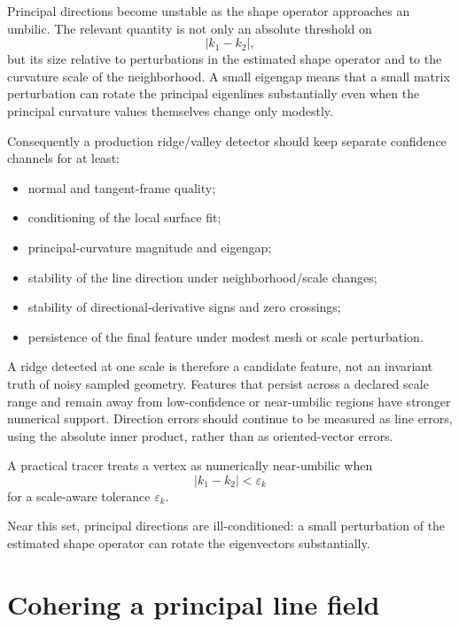 \begin{remark}
Principal directions become unstable as the shape operator approaches an
umbilic.  The relevant quantity is not only an absolute threshold on
\[
|k_1-k_2|,
\]
but its size relative to perturbations in the estimated shape operator and to
the curvature scale of the neighborhood.  A small eigengap means that a small
matrix perturbation can rotate the principal eigenlines substantially even when
the principal curvature values themselves change only modestly.

Consequently a production ridge/valley detector should keep separate confidence
channels for at least:

\begin{itemize}
\item normal and tangent-frame quality;
\item conditioning of the local surface fit;
\item principal-curvature magnitude and eigengap;
\item stability of the line direction under neighborhood/scale changes;
\item stability of directional-derivative signs and zero crossings;
\item persistence of the final feature under modest mesh or scale perturbation.
\end{itemize}

A ridge detected at one scale is therefore a candidate feature, not an invariant
truth of noisy sampled geometry.  Features that persist across a declared scale
range and remain away from low-confidence or near-umbilic regions have stronger
numerical support.  Direction errors should continue to be measured as line
errors, using the absolute inner product, rather than as oriented-vector errors.
\end{remark}

\begin{definition}\label{def:vii42-umbilic-tol}
A practical tracer treats a vertex as numerically near-umbilic when
\[
|k_1-k_2|<\varepsilon_k
\]
for a scale-aware tolerance \(\varepsilon_k\).
\end{definition}

Near this set, principal directions are ill-conditioned: a small perturbation of
the estimated shape operator can rotate the eigenvectors substantially.

\section{Cohering a principal line field}

